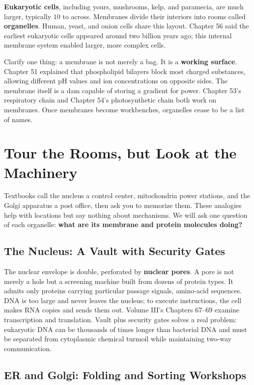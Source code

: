 \textbf{Eukaryotic cells}, including yours, mushrooms, kelp, and paramecia, are much larger, typically $10$ to  across. Membranes divide their interiors into rooms called \textbf{organelles}. Human, yeast, and onion cells share this layout. Chapter 56 said the earliest eukaryotic cells appeared around two billion years ago; this internal membrane system enabled larger, more complex cells.

Clarify one thing: a membrane is not merely a bag. It is a \textbf{working surface}. Chapter 51 explained that phospholipid bilayers block most charged substances, allowing different pH values and ion concentrations on opposite sides. The membrane itself is a dam capable of storing a gradient for power. Chapter 53's respiratory chain and Chapter 54's photosynthetic chain both work on membranes. Once membranes become workbenches, organelles cease to be a list of names.

\section{Tour the Rooms, but Look at the Machinery}

Textbooks call the nucleus a control center, mitochondria power stations, and the Golgi apparatus a post office, then ask you to memorize them. These analogies help with locations but say nothing about mechanisms. We will ask one question of each organelle: \textbf{what are its membrane and protein molecules doing?}

\subsection{The Nucleus: A Vault with Security Gates}

The nuclear envelope is double, perforated by \textbf{nuclear pores}. A pore is not merely a hole but a screening machine built from dozens of protein types. It admits only proteins carrying particular passage signals, amino-acid sequences. DNA is too large and never leaves the nucleus; to execute instructions, the cell makes RNA copies and sends them out. Volume III's Chapters 67--69 examine transcription and translation. Vault plus security gates solves a real problem: eukaryotic DNA can be thousands of times longer than bacterial DNA and must be separated from cytoplasmic chemical turmoil while maintaining two-way communication.

\subsection{ER and Golgi: Folding and Sorting Workshops}

